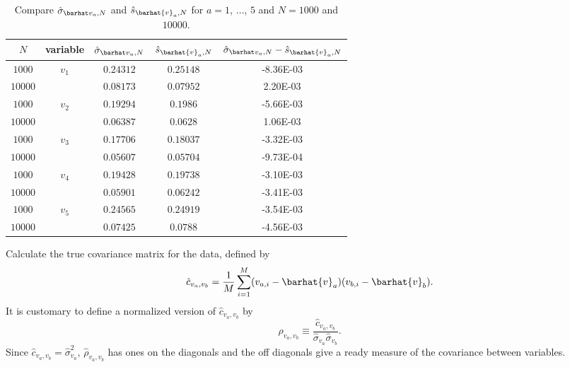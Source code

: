 \begin{table}[H]
    \centering
    \caption{Compare \(\sgbar{a}\) and \(\hat{s}_{\barhat{v}_a,N}\) for
    \(a = 1\), \(\ldots\), \(5\) and \(N = 1000\) and \(10000\).}
    \label{tab:s}
    \begin{tabular}{@{}ccccc@{}}
        \toprule
        \(N\)     & variable                 & \(\sgbar{a}\) & \(\hat{s}_{\barhat{v}_a,N}\) & \(\sgbar{a}-\hat{s}_{\barhat{v}_a,N}\) \\
        \midrule
        \(1000\)  & \multirow{2}{*}{\(v_1\)} & \(0.24312\)   & \(0.25148\)                  & \num{-8.36E-03}                        \\
        \(10000\) &                          & \(0.08173\)   & \(0.07952\)                  & \num{2.20E-03}                         \\
        \cmidrule{1-2}
        \(1000\)  & \multirow{2}{*}{\(v_2\)} & \(0.19294\)   & \(0.1986\)                   & \num{-5.66E-03}                        \\
        \(10000\) &                          & \(0.06387\)   & \(0.0628\)                   & \num{1.06E-03}                         \\
        \cmidrule{1-2}
        \(1000\)  & \multirow{2}{*}{\(v_3\)} & \(0.17706\)   & \(0.18037\)                  & \num{-3.32E-03}                        \\
        \(10000\) &                          & \(0.05607\)   & \(0.05704\)                  & \num{-9.73E-04}                        \\
        \cmidrule{1-2}
        \(1000\)  & \multirow{2}{*}{\(v_4\)} & \(0.19428\)   & \(0.19738\)                  & \num{-3.10E-03}                        \\
        \(10000\) &                          & \(0.05901\)   & \(0.06242\)                  & \num{-3.41E-03}                        \\
        \cmidrule{1-2}
        \(1000\)  & \multirow{2}{*}{\(v_5\)} & \(0.24565\)   & \(0.24919\)                  & \num{-3.54E-03}                        \\
        \(10000\) &                          & \(0.07425\)   & \(0.0788\)                   & \num{-4.56E-03}                        \\
        \bottomrule
    \end{tabular}
\end{table}


\Question{} Calculate the true covariance matrix for the data, defined by
%
\begin{equation}
    \hat{c}_{v_a, v_b} = \frac{ 1 }{ M }
    \sum_{i=1}^M (v_{a,i} - \barhat{v}_a) (v_{b,i} - \barhat{v}_b).
\end{equation}
%
It is customary to define a normalized version of \(\hat{c}_{v_a, v_b}\) by
%
\begin{equation}
    \hat{\rho}_{v_a, v_b} \equiv \frac{ \hat{c}_{v_a, v_b} }{ \hat{\sigma}_{v_a} \hat{\sigma}_{v_b} }.
\end{equation}
%
Since \(\hat{c}_{v_a, v_b} = \hat{\sigma}_{v_a}^2\),
\(\hat{\rho}_{v_a, v_b}\) has ones on the diagonals and the off diagonals give a
ready measure of the covariance between variables.

